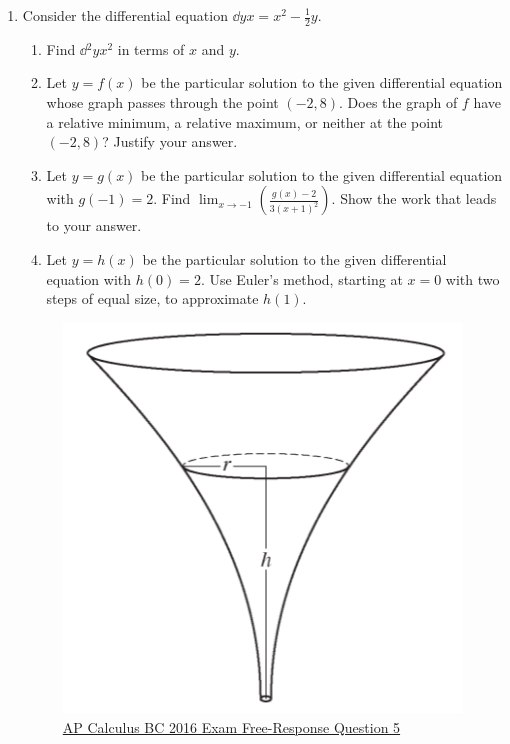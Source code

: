 \begin{enumerate}
	\item Consider the differential equation $\dd{y}{x} = x^2 - \frac{1}{2}y$.
		\begin{enumerate}
			\item Find $\dd{^2y}{x^2}$ in terms of $x$ and $y$.
			\item Let $y=f(x)$ be the particular solution to the given differential equation whose graph passes through the point $(-2,8)$.
				Does the graph of $f$ have a relative minimum, a relative maximum, or neither at the point $(-2,8)$?
				Justify your answer.
			\item Let $y=g(x)$ be the particular solution to the given differential equation with $g(-1)=2$.
				Find $\lim_{x\to -1}{\left(\frac{g(x)-2}{3(x+1)^2}\right)}$.
				Show the work that leads to your answer.
			\item Let $y=h(x)$ be the particular solution to the given differential equation with $h(0)=2$.
				Use Euler's method, starting at $x=0$ with two steps of equal size, to approximate $h(1)$.
		\end{enumerate}
	
	\begin{figure}[H]
		\label{2016_5}
		\centering
		\includegraphics{./additional_materials/2016_5.png}
		\caption{\hyperref{https://secure-media.collegeboard.org/digitalServices/pdf/ap/ap16\_frq\_calculus\_bc.pdf}{}{}{AP Calculus BC 2016 Exam Free-Response Question 5}}
	\end{figure}
	

\end{enumerate}
